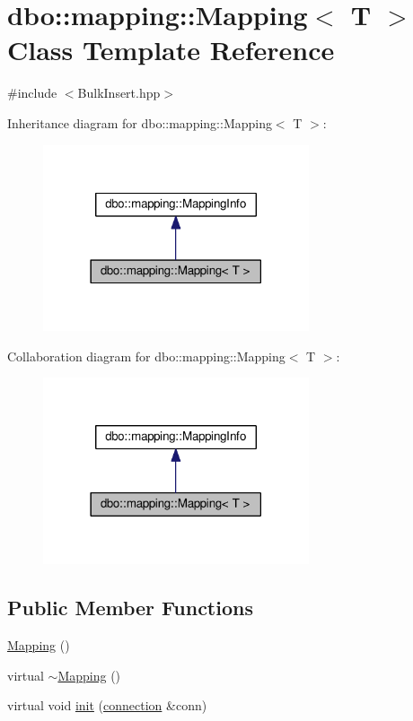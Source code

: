 \hypertarget{classdbo_1_1mapping_1_1_mapping}{\section{dbo\+:\+:mapping\+:\+:Mapping$<$ T $>$ Class Template Reference}
\label{classdbo_1_1mapping_1_1_mapping}
}


{\ttfamily \#include $<$Bulk\+Insert.\+hpp$>$}



Inheritance diagram for dbo\+:\+:mapping\+:\+:Mapping$<$ T $>$\+:\nopagebreak
\begin{figure}[H]
\begin{center}
\leavevmode
\includegraphics[width=222pt]{classdbo_1_1mapping_1_1_mapping__inherit__graph}
\end{center}
\end{figure}


Collaboration diagram for dbo\+:\+:mapping\+:\+:Mapping$<$ T $>$\+:\nopagebreak
\begin{figure}[H]
\begin{center}
\leavevmode
\includegraphics[width=222pt]{classdbo_1_1mapping_1_1_mapping__coll__graph}
\end{center}
\end{figure}
\subsection*{Public Member Functions}
\begin{DoxyCompactItemize}
\item 
\hyperlink{classdbo_1_1mapping_1_1_mapping_a927cfe4cb8b09a4abab992f794ccef7c}{Mapping} ()
\item 
virtual \hyperlink{classdbo_1_1mapping_1_1_mapping_a3e6a13c2c57af34bc24c85ba17fc95a0}{$\sim$\+Mapping} ()
\item 
virtual void \hyperlink{classdbo_1_1mapping_1_1_mapping_a62d1a2cf4a87bda5586012c674178b32}{init} (\hyperlink{classdbo_1_1connection}{connection} \&conn)
\end{DoxyCompactItemize}
